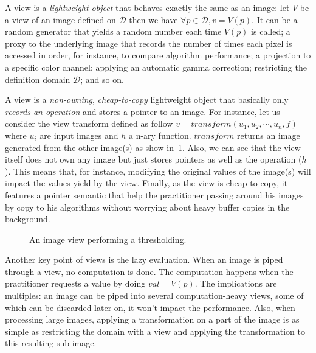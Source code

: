A view is a \emph{lightweight object} that behaves exactly the same as an image: let $V$ be a view of an image defined
on $\mathcal{D}$ then we have $\forall{p}\in\mathcal{D}, v = V(p)$. It can be a random generator that yields a random
number each time $V(p)$ is called; a proxy to the underlying image that records the number of times each pixel is
accessed in order, for instance, to compare algorithm performance; a projection to a specific color channel; applying an
automatic gamma correction; restricting the definition domain $\mathcal{D}$; and so on.

A view is a \emph{non-owning}, \emph{cheap-to-copy} lightweight object that basically only \emph{records an operation}
and stores a pointer to an image. For instance, let us consider the view transform defined as follow $v = transform(u_1,
  u_2, \cdots, u_n, f)$ where $u_i$ are input images and $h$ a n-ary function. $transform$ returns an image generated from
the other image(s) as show in~\cref{fig.view.threshold}. Also, we can see that the view itself does not own any image
but just stores pointers as well as the operation ($h$). This means that, for instance, modifying the original values of
the image(s) will impact the values yield by the view. Finally, as the view is cheap-to-copy, it features a pointer
semantic that help the practitioner passing around his images by copy to his algorithms without worrying about heavy
buffer copies in the background.

\begin{figure}[tbh]
  \centering
  \begin{minipage}{\linewidth}
    
  \end{minipage}
  \caption{An image view performing a thresholding.}
  \label{fig.view.threshold}
\end{figure}

Another key point of views is the lazy evaluation. When an image is piped through a view, no computation is done. The
computation happens when the practitioner requests a value by doing $val = V(p)$. The implications are multiples: an
image can be piped into several computation-heavy views, some of which can be discarded later on, it won't impact the
performance. Also, when processing large images, applying a transformation on a part of the image is as simple as
restricting the domain with a view and applying the transformation to this resulting sub-image.

